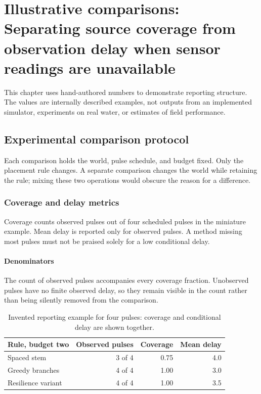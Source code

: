 \chapter{Illustrative comparisons: Separating source coverage from observation delay when sensor readings are unavailable}\label{demo-evaluation}
This chapter uses hand-authored numbers to demonstrate reporting structure. The values are internally described examples, not outputs from an implemented simulator, experiments on real water, or estimates of field performance.
\section{Experimental comparison protocol}\label{demo-evaluation-protocol}
Each comparison holds the world, pulse schedule, and budget fixed. Only the placement rule changes. A separate comparison changes the world while retaining the rule; mixing these two operations would obscure the reason for a difference.
\subsection{Coverage and delay metrics}\label{demo-evaluation-metrics}
Coverage counts observed pulses out of four scheduled pulses in the miniature example. Mean delay is reported only for observed pulses. A method missing most pulses must not be praised solely for a low conditional delay.
\subsubsection{Denominators}\label{demo-evaluation-denominators}
The count of observed pulses accompanies every coverage fraction. Unobserved pulses have no finite observed delay, so they remain visible in the count rather than being silently removed from the comparison.
\begin{table}[htbp]
\centering
\begin{tabular}{lrrr}
\hline
Rule, budget two & Observed pulses & Coverage & Mean delay \\
\hline
Spaced stem & 3 of 4 & 0.75 & 4.0 \\
Greedy branches & 4 of 4 & 1.00 & 3.0 \\
Resilience variant & 4 of 4 & 1.00 & 3.5 \\
\hline
\end{tabular}
\caption{Invented reporting example for four pulses: coverage and conditional delay are shown together.}\label{demo-tab-results}
\end{table}
